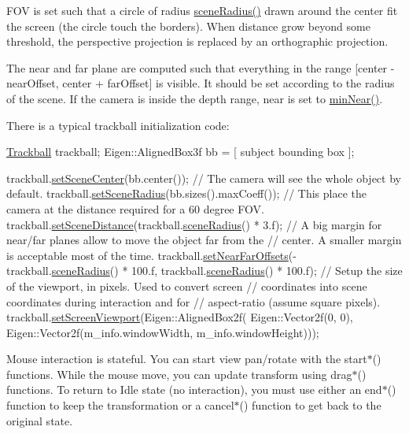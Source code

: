 F\+OV is set such that a circle of radius \hyperlink{class_trackball_acd26e3c6e72d935e556e6b10bd2a0c1d}{scene\+Radius()} drawn around the center fit the screen (the circle touch the borders). When distance grow beyond some threshold, the perspective projection is replaced by an orthographic projection.

The near and far plane are computed such that everything in the range \mbox{[}center -\/ near\+Offset, center + far\+Offset\mbox{]} is visible. It should be set according to the radius of the scene. If the camera is inside the depth range, near is set to \hyperlink{class_trackball_ae10b18ba9b38e588e996e35a709bab29}{min\+Near()}.

There is a typical trackball initialization code\+: 
\begin{DoxyCode}
\hyperlink{class_trackball}{Trackball} trackball;
Eigen::AlignedBox3f bb = [ subject bounding box ];

trackball.\hyperlink{class_trackball_a279072f30b8e41189b05ce0a1caf36a0}{setSceneCenter}(bb.center());
\textcolor{comment}{// The camera will see the whole object by default.}
trackball.\hyperlink{class_trackball_ab546e1363934d09d8ed292dbd8b34e51}{setSceneRadius}(bb.sizes().maxCoeff());
\textcolor{comment}{// This place the camera at the distance required for a 60 degree FOV.}
trackball.\hyperlink{class_trackball_a20407b903581f2e34ca12592f8e0c41a}{setSceneDistance}(trackball.\hyperlink{class_trackball_acd26e3c6e72d935e556e6b10bd2a0c1d}{sceneRadius}() * 3.f);
\textcolor{comment}{// A big margin for near/far planes allow to move the object far from the}
\textcolor{comment}{// center. A smaller margin is acceptable most of the time.}
trackball.\hyperlink{class_trackball_adb8173ceaf1d83d324751a6379f769ef}{setNearFarOffsets}(-trackball.\hyperlink{class_trackball_acd26e3c6e72d935e556e6b10bd2a0c1d}{sceneRadius}() * 100.f,
                               trackball.\hyperlink{class_trackball_acd26e3c6e72d935e556e6b10bd2a0c1d}{sceneRadius}() * 100.f);
\textcolor{comment}{// Setup the size of the viewport, in pixels. Used to convert screen}
\textcolor{comment}{// coordinates into scene coordinates during interaction and for}
\textcolor{comment}{// aspect-ratio (assume square pixels).}
trackball.\hyperlink{class_trackball_aac926ad4f5144195a88b47203e3b5ca7}{setScreenViewport}(Eigen::AlignedBox2f(
        Eigen::Vector2f(0, 0),
        Eigen::Vector2f(m\_info.windowWidth, m\_info.windowHeight)));
\end{DoxyCode}


Mouse interaction is stateful. You can start view pan/rotate with the start$\ast$() functions. While the mouse move, you can update transform using drag$\ast$() functions. To return to Idle state (no interaction), you must use either an end$\ast$() function to keep the transformation or a cancel$\ast$() function to get back to the original state.

